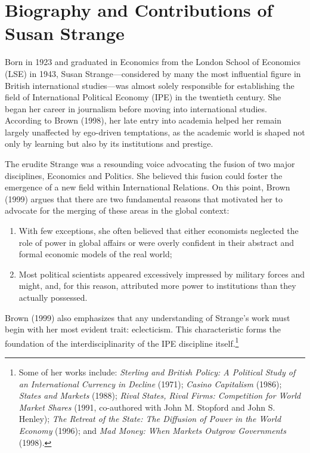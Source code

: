 \section{Biography and Contributions of Susan Strange}

Born in 1923 and graduated in Economics from the London School of Economics (LSE) in 1943, Susan Strange---considered by many the most influential figure in British international studies---was almost solely responsible for establishing the field of International Political Economy (IPE) in the twentieth century. She began her career in journalism before moving into international studies. According to Brown (1998), her late entry into academia helped her remain largely unaffected by ego-driven temptations, as the academic world is shaped not only by learning but also by its institutions and prestige.

The erudite Strange was a resounding voice advocating the fusion of two major disciplines, Economics and Politics. She believed this fusion could foster the emergence of a new field within International Relations. On this point, Brown (1999) argues that there are two fundamental reasons that motivated her to advocate for the merging of these areas in the global context:
\begin{enumerate}
    \item With few exceptions, she often believed that either economists neglected the role of power in global affairs or were overly confident in their abstract and formal economic models of the real world;
    \item Most political scientists appeared excessively impressed by military forces and might, and, for this reason, attributed more power to institutions than they actually possessed.
\end{enumerate}

Brown (1999) also emphasizes that any understanding of Strange's work must begin with her most evident trait: eclecticism. This characteristic forms the foundation of the interdisciplinarity of the IPE discipline itself.\footnote{Some of her works include: \textit{Sterling and British Policy: A Political Study of an International Currency in Decline} (1971); \textit{Casino Capitalism} (1986); \textit{States and Markets} (1988); \textit{Rival States, Rival Firms: Competition for World Market Shares} (1991, co-authored with John M. Stopford and John S. Henley); \textit{The Retreat of the State: The Diffusion of Power in the World Economy} (1996); and \textit{Mad Money: When Markets Outgrow Governments} (1998).}

